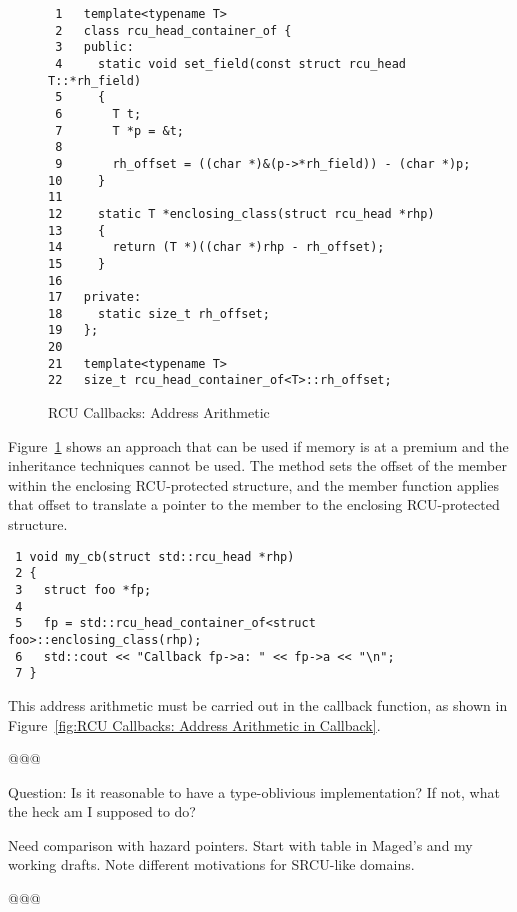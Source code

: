 \documentclass[letterpaper,twocolumn,10pt]{article}
\begin{document}
\begin{figure}[tbp]
{ \scriptsize
\begin{verbatim}
 1   template<typename T>
 2   class rcu_head_container_of {
 3   public:
 4     static void set_field(const struct rcu_head T::*rh_field)
 5     {
 6       T t;
 7       T *p = &t;
 8
 9       rh_offset = ((char *)&(p->*rh_field)) - (char *)p;
10     }
11
12     static T *enclosing_class(struct rcu_head *rhp)
13     {
14       return (T *)((char *)rhp - rh_offset);
15     }
16
17   private:
18     static size_t rh_offset;
19   };
20
21   template<typename T>
22   size_t rcu_head_container_of<T>::rh_offset;
\end{verbatim}
}
\caption{RCU Callbacks: Address Arithmetic}
\label{fig:RCU Callbacks: Address Arithmetic}
\end{figure}

Figure~\ref{fig:RCU Callbacks: Address Arithmetic}
shows an approach that can be used if memory is at a premium and
the inheritance techniques cannot be used.
The  method sets the offset of the
 member within the enclosing RCU-protected
structure, and the  member function
applies that offset to translate a pointer to the
 member to the enclosing RCU-protected structure.

\begin{figure*}[tbp]
{ \scriptsize
\begin{verbatim}
 1 void my_cb(struct std::rcu_head *rhp)
 2 {
 3   struct foo *fp;
 4
 5   fp = std::rcu_head_container_of<struct foo>::enclosing_class(rhp);
 6   std::cout << "Callback fp->a: " << fp->a << "\n";
 7 }
\end{verbatim}
}
\caption{RCU Callbacks: Address Arithmetic in Callback}
\label{fig:RCU Callbacks: Address Arithmetic in Callback}
\end{figure*}

This address arithmetic must be carried out in the callback function,
as shown in
Figure~\ref{fig:RCU Callbacks: Address Arithmetic in Callback}.

@@@

Question:  Is it reasonable to have a type-oblivious implementation?
	If not, what the heck am I supposed to do?

Need comparison with hazard pointers.  Start with table in Maged's
	and my working drafts.  Note different motivations for
	SRCU-like domains.

@@@
\end{document}
